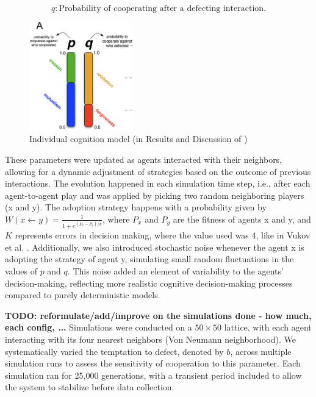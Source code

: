 \documentclass[runningheads]{llncs}
\begin{document}
\[
q: \text{Probability of cooperating after a defecting interaction.}
\]


\begin{figure}[htbp]
    \centering
    \includegraphics[width=0.4\textwidth]{modellingindividualcognition.png}
    \caption{Individual cognition model (in Results and Discussion of \cite{vukov})}
    \label{fig:coop_vs_b}
\end{figure}

These parameters were updated as agents interacted with their neighbors, allowing
for a dynamic adjustment of strategies based on the outcome of previous interactions.
The evolution happened in each simulation time step,
i.e., after each agent-to-agent play and was applied by picking two random
neighboring players (x and y). The adoption strategy happens with a probability
given by $W(x \leftarrow y) = \frac{1}{1 + e^{(P_x - P_y)/k}}$, where $P_x$ and $P_y$
are the fitness of agents x and y, and $K$ represents errors in decision making,
where the value used was 4, like in Vukov et al. \cite{vukov}.
Additionally, we also introduced stochastic noise whenever the agent x is
adopting the strategy of agent y, simulating small random fluctuations in the
values of \( p \) and \( q \).
This noise added an element of variability to the agents' decision-making,
reflecting more realistic cognitive decision-making processes compared to
purely deterministic models.


\textbf{TODO: reformulate/add/improve on the simulations done - how much, each config, ...}
Simulations were conducted on a \( 50 \times 50 \) lattice, with each agent interacting with its four nearest neighbors (Von Neumann neighborhood). We systematically varied the temptation to defect, denoted by \( b \), across multiple simulation runs to assess the sensitivity of cooperation to this parameter. Each simulation ran for 25,000 generations, with a transient period included to allow the system to stabilize before data collection.
\end{document}
